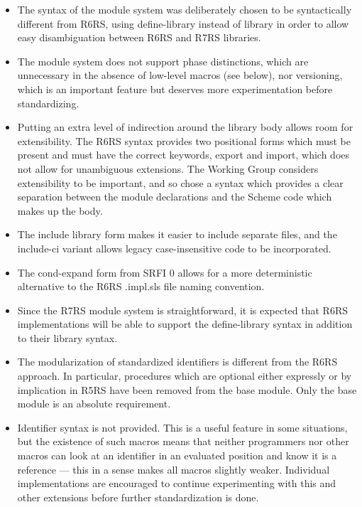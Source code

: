 \begin{itemize}
\item The syntax of the module system was deliberately chosen to be
syntactically different from R6RS, using {\cf define-library} instead of
{\cf library} in order to allow easy disambiguation between R6RS and R7RS libraries.

\item The module system does not support phase distinctions, which
are unnecessary in the absence of low-level macros (see below),
nor versioning, which is an important feature but deserves more
experimentation before standardizing.

\item Putting an extra level of indirection around the library body
allows room for extensibility. The R6RS syntax provides two positional
forms which must be present and must have the correct keywords,
{\cf export} and {\cf import}, which does not allow for unambiguous
extensions. The Working Group considers extensibility to be important,
and so chose a syntax which provides
a clear separation between the module declarations and the Scheme code
which makes up the body.

\item The {\cf include} library form
makes it easier to include separate files, 
and the {\cf include-ci} variant allows legacy 
case-insensitive code to be incorporated.

\item The {\cf cond-expand} form from SRFI 0 allows for a more
deterministic alternative to the R6RS {\cf .impl.sls} file naming
convention.

\item Since the R7RS module system is straightforward, it is expected
that R6RS implementations will be able to support the {\cf define-library}
syntax in addition to their {\cf library} syntax.

\item The modularization of standardized identifiers is different from the R6RS
approach. In particular, procedures which are optional either expressly
or by implication in R5RS have been removed from the base module.
Only the base module is an absolute requirement.

\item Identifier syntax is not provided. This is a useful feature in
some situations, but the existence of such macros means that neither
programmers nor other macros can look at an identifier in an evaluated
position and know it is a reference --- this in a sense makes all macros
slightly weaker. Individual implementations are encouraged to continue
experimenting with this and other extensions before further standardization is done.


\end{itemize}
